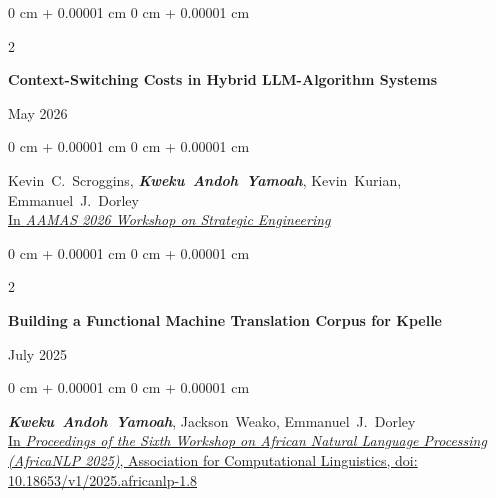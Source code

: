 \documentclass[10pt, letterpaper]{article}
\newenvironment{onecolentry}{
    \begin{adjustwidth}{
        0 cm + 0.00001 cm
    }{
        0 cm + 0.00001 cm
    }
}{
    \end{adjustwidth}
} %
\newenvironment{twocolentry}[2][]{
    \onecolentry
    \def\secondColumn{#2}
    \setcolumnwidth{\fill, 4.5 cm}
    \begin{paracol}{2}
}{
    \switchcolumn \raggedleft \secondColumn
    \end{paracol}
    \endonecolentry
} %
\begin{document}
        \vspace{0.20 cm}
        \begin{samepage}
            \begin{twocolentry}{
                May 2026
            }
                \textbf{Context-Switching Costs in Hybrid LLM-Algorithm Systems}
            \end{twocolentry}
            \vspace{0.10 cm}
            \begin{onecolentry}
                \mbox{Kevin C. Scroggins}, \mbox{\textbf{\textit{Kweku Andoh Yamoah}}}, \mbox{Kevin Kurian}, \mbox{Emmanuel J. Dorley} \\
                \vspace{0.10 cm}
                \href{http://openreview.net/forum?id=swdY749xvI}{In \textit{AAMAS 2026 Workshop on Strategic Engineering}}
                \end{onecolentry}
        \end{samepage}

        \vspace{0.20 cm}
        \begin{samepage}
            \begin{twocolentry}{
                July 2025
            }
                \textbf{Building a Functional Machine Translation Corpus for Kpelle}
            \end{twocolentry}
            \vspace{0.10 cm}
            \begin{onecolentry}
                \mbox{\textbf{\textit{Kweku Andoh Yamoah}}}, \mbox{Jackson Weako}, \mbox{Emmanuel J. Dorley} \\
                \vspace{0.10 cm}
                \href{https://aclanthology.org/2025.africanlp-1.8/}{ In \textit{Proceedings of the Sixth Workshop on African Natural Language Processing (AfricaNLP 2025)}, Association for Computational Linguistics, doi: 10.18653/v1/2025.africanlp-1.8}
                \end{onecolentry}
        \end{samepage}
\end{document}
